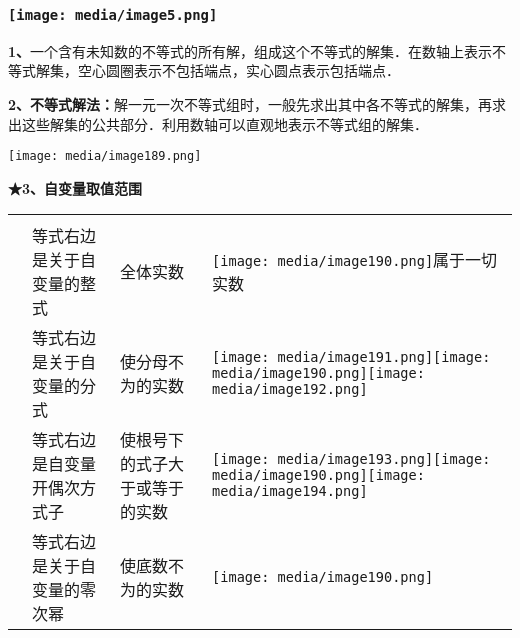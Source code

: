 \documentclass[a4paper,11pt,UTF8]{ctexart}
\begin{document}
\hypertarget{section-22}{%
\subsubsection{}\label{section-22}}

\hypertarget{ux5b66ux79d1ux7f51www.zxxk.com--ux6559ux80b2ux8d44ux6e90ux95e8ux6237ux63d0ux4f9bux8bd5ux9898ux8bd5ux5377ux6559ux6848ux8bfeux4ef6ux6559ux5b66ux8bbaux6587ux7d20ux6750ux7b49ux5404ux7c7bux6559ux5b66ux8d44ux6e90ux5e93ux4e0bux8f7dux8fd8ux6709ux5927ux91cfux4e30ux5bccux7684ux6559ux5b66ux8d44ux8baf-34}{%
\subsubsection{\texorpdfstring{\protect\texttt{[image: media/image5.png]}}{学科网(www.zxxk.com)-\/-教育资源门户，提供试题试卷、教案、课件、教学论文、素材等各类教学资源库下载，还有大量丰富的教学资讯！}}\label{ux5b66ux79d1ux7f51www.zxxk.com--ux6559ux80b2ux8d44ux6e90ux95e8ux6237ux63d0ux4f9bux8bd5ux9898ux8bd5ux5377ux6559ux6848ux8bfeux4ef6ux6559ux5b66ux8bbaux6587ux7d20ux6750ux7b49ux5404ux7c7bux6559ux5b66ux8d44ux6e90ux5e93ux4e0bux8f7dux8fd8ux6709ux5927ux91cfux4e30ux5bccux7684ux6559ux5b66ux8d44ux8baf-34}}

\textbf{1、}一个含有未知数的不等式的所有解，组成这个不等式的解集．在数轴上表示不等式解集，空心圆圈表示不包括端点，实心圆点表示包括端点．

\textbf{2、不等式解法：}解一元一次不等式组时，一般先求出其中各不等式的解集，再求出这些解集的公共部分．利用数轴可以直观地表示不等式组的解集．

\texttt{[image: media/image189.png]}

\textbf{★3、自变量取值范围}

\begin{longtable}[]{@{}llll@{}}
\toprule
\endhead
& & &\tabularnewline
& 等式右边是关于自变量的整式 & 全体实数 &
\texttt{[image: media/image190.png]}属于一切实数\tabularnewline
& 等式右边是关于自变量的分式 & 使分母不为的实数 &
\texttt{[image: media/image191.png]}\texttt{[image: media/image190.png]}\texttt{[image: media/image192.png]}\tabularnewline
& 等式右边是自变量开偶次方式子 & 使根号下的式子大于或等于的实数 &
\texttt{[image: media/image193.png]}\texttt{[image: media/image190.png]}\texttt{[image: media/image194.png]}\tabularnewline
& 等式右边是关于自变量的零次幂 & 使底数不为的实数 &
\texttt{[image: media/image190.png]}\tabularnewline
\bottomrule
\end{longtable}
\end{document}
